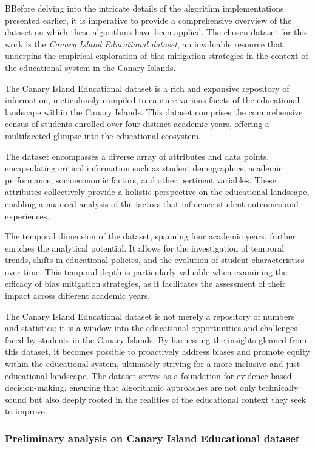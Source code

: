 \documentclass[12pt,a4paper,openright,twoside]{book}
\begin{document}
BBefore delving into the intricate details of the algorithm implementations presented earlier, it is imperative to provide a comprehensive overview of the dataset on which these algorithms have been applied. The chosen dataset for this work is the \emph{Canary Island Educational dataset}, an invaluable resource that underpins the empirical exploration of bias mitigation strategies in the context of the educational system in the Canary Islands.

The Canary Island Educational dataset is a rich and expansive repository of information, meticulously compiled to capture various facets of the educational landscape within the Canary Islands. This dataset comprises the comprehensive census of students enrolled over four distinct academic years, offering a multifaceted glimpse into the educational ecosystem.

The dataset encompasses a diverse array of attributes and data points, encapsulating critical information such as student demographics, academic performance, socioeconomic factors, and other pertinent variables. These attributes collectively provide a holistic perspective on the educational landscape, enabling a nuanced analysis of the factors that influence student outcomes and experiences.

The temporal dimension of the dataset, spanning four academic years, further enriches the analytical potential. It allows for the investigation of temporal trends, shifts in educational policies, and the evolution of student characteristics over time. This temporal depth is particularly valuable when examining the efficacy of bias mitigation strategies, as it facilitates the assessment of their impact across different academic years.

The Canary Island Educational dataset is not merely a repository of numbers and statistics; it is a window into the educational opportunities and challenges faced by students in the Canary Islands. By harnessing the insights gleaned from this dataset, it becomes possible to proactively address biases and promote equity within the educational system, ultimately striving for a more inclusive and just educational landscape. The dataset serves as a foundation for evidence-based decision-making, ensuring that algorithmic approaches are not only technically sound but also deeply rooted in the realities of the educational context they seek to improve.

\subsubsection{Preliminary analysis on Canary Island Educational dataset}
\end{document}

